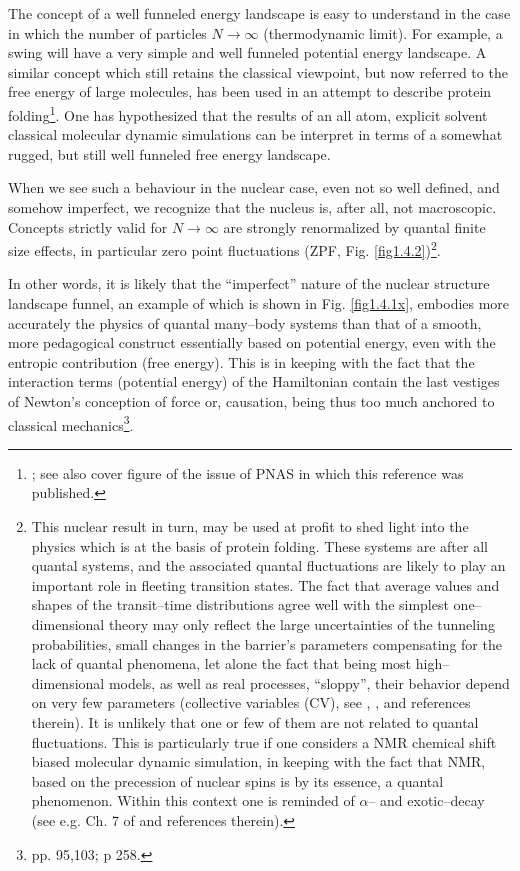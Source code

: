 The concept of a well funneled energy landscape  is easy to understand in the case in which the number of particles $N\rightarrow \infty$ (thermodynamic limit). For example, a swing will have a very simple and well funneled potential energy landscape. A similar concept which still retains the classical viewpoint, but now referred to the free energy of large molecules, has been used in an attempt to describe protein folding\footnote{\cite{Wolynes:16,Wolynes:12}; see also cover figure of the issue of PNAS in which this reference was published.}. One has hypothesized that the results of an all atom, explicit solvent classical molecular dynamic simulations can be interpret in terms of a somewhat rugged, but still well funneled free energy landscape.

When we see such a behaviour in the nuclear case, even not so well defined, and somehow imperfect, we recognize that the nucleus is, after all, not macroscopic. Concepts strictly valid for $N\rightarrow\infty$ are strongly renormalized by quantal finite size effects, in particular zero point fluctuations (ZPF, Fig. \ref{fig1.4.2})\footnote{This nuclear result in turn, may be used at profit to shed light into the physics which is at the basis of protein folding. These systems are after all quantal systems, and the associated quantal fluctuations are likely to play an important role in fleeting transition states. The fact that average values and shapes of the transit--time distributions agree well with the simplest one--dimensional theory may only reflect the large uncertainties of the tunneling probabilities, small changes in the barrier's parameters compensating for the lack of quantal phenomena, let alone the fact that being most high--dimensional models, as well as real processes, ``sloppy'', their behavior depend on very few parameters (collective variables (CV), see \cite{Buchanan:15}, \cite{Transtrum:15}, and references therein). It is unlikely that one or few of them are not  related to quantal fluctuations. This is particularly true if one considers a NMR chemical shift biased molecular dynamic simulation, in keeping with the fact that NMR, based  on the precession of nuclear spins is by its essence, a quantal phenomenon. Within this context one is reminded of $\alpha$-- and exotic--decay (see e.g. Ch. 7 of \cite{Brink:05} and references therein).}.

In other words, it is likely that the ``imperfect'' nature of the nuclear structure landscape funnel, an example of which is shown in Fig. \ref{fig1.4.1x}, embodies more accurately the physics of quantal many--body systems than that of a smooth, more pedagogical construct essentially based on potential energy, even with the entropic contribution (free energy). This is in keeping with the fact that the interaction terms (potential energy) of the Hamiltonian contain the last vestiges of Newton's conception of force or, causation, being thus too much anchored to classical mechanics\footnote{\cite{Born:48} pp. 95,103; \cite{Pais:86} p 258.}.

